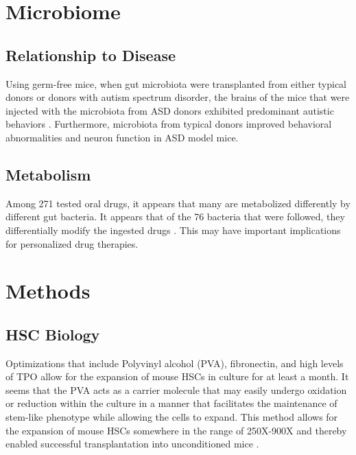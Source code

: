 \documentclass[]{book}
\begin{document}
\hypertarget{microbiome}{%
\chapter{Microbiome}\label{microbiome}}

\hypertarget{relationship-to-disease}{%
\section{Relationship to Disease}\label{relationship-to-disease}}

Using germ-free mice, when gut microbiota were transplanted from either typical donors or donors with autism spectrum disorder, the brains of the mice that were injected with the microbiota from ASD donors exhibited predominant autistic behaviors \citep{sharon2019human}. Furthermore, microbiota from typical donors improved behavioral abnormalities and neuron function in ASD model mice.

\hypertarget{metabolism}{%
\section{Metabolism}\label{metabolism}}

Among 271 tested oral drugs, it appears that many are metabolized differently by different gut bacteria. It appears that of the 76 bacteria that were followed, they differentially modify the ingested drugs \citep{zimmermann2019mapping}. This may have important implications for personalized drug therapies.

\hypertarget{methods}{%
\chapter{Methods}\label{methods}}

\hypertarget{hsc-biology}{%
\section{HSC Biology}\label{hsc-biology}}

Optimizations that include Polyvinyl alcohol (PVA), fibronectin, and high levels of TPO allow for the expansion of mouse HSCs in culture for at least a month. It seems that the PVA acts as a carrier molecule that may easily undergo oxidation or reduction within the culture in a manner that facilitates the maintenance of stem-like phenotype while allowing the cells to expand. This method allows for the expansion of mouse HSCs somewhere in the range of 250X-900X and thereby enabled successful transplantation into unconditioned mice \citep{wilkinson2019long}.
\end{document}
